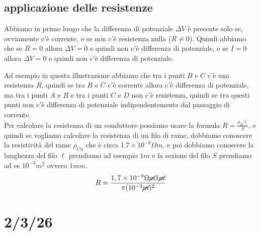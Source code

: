 \documentclass[a4paper, oneside]{article}
\begin{document}
\subsection{applicazione delle resistenze}
Abbiamo in primo luogo che la differenza di potenziale $\Delta V$ è presente solo se, ovviamente c'è corrente, e se non c'è resistenza nulla ($R \neq 0$). Quindi abbiamo 
che se $R = 0$ allora $\Delta V = 0$ e quindi non c'è differenza di potenziale, e se $I = 0$ allora $\Delta V = 0$ e quindi non c'è differenza di potenziale.\\
\begin{center}
\end{center}
Ad esempio in questa illustrazione abbiamo che tra i punti $B$ e $C$ c'è una resistenza $R$, quindi se tra $B$ e $C$  c'è corrente allora  c'è differenza di potenziale, ma tra i punti $A$ e $B$ e tra i punti $C$ e $D$ non c'è resistenza, quindi se tra questi punti non c'è differenza di potenziale indipendentemente dal passaggio di corrente.\\
Per calcolare la resistenza di un conduttore possiamo usare la formula $R = \frac{\rho_R \ell}{S}$, e quindi se vogliamo calcolare la resistenza di un filo di rame, dobbiamo conoscere la resistività del rame $\rho_{Cu}$ che è circa $1.7 \times 10^{-8} \Omega m$, e poi dobbiamo conoscere la lunghezza del filo $\ell$ prendiamo ad esempio $1 m$ e la sezione del filo $S$ prendiamo ad es $10^{-3} m^2$ ovvero $1mm$.
\begin{gather*}
    R = \frac{1,7 \times 10^{-8} \Omega \cancel{m} 1 \cancel{m}}{\pi ( 10^{-3} \cancel{m})^2}
\end{gather*}

\section{2/3/26}
\end{document}
